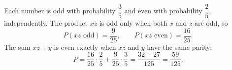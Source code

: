 Each number is odd with probability $\dfrac{3}{5}$ and even with probability $\dfrac{2}{5}$, independently. The product $xz$ is odd only when both $x$ and $z$ are odd, so
\[P(xz\text{ odd})=\dfrac{9}{25},\qquad P(xz\text{ even})=\dfrac{16}{25}.\]
The sum $xz+y$ is even exactly when $xz$ and $y$ have the same parity:
\[
P=\dfrac{16}{25}\cdot\dfrac{2}{5}+\dfrac{9}{25}\cdot\dfrac{3}{5}=\dfrac{32+27}{125}=\boxed{\dfrac{59}{125}}.
\]
